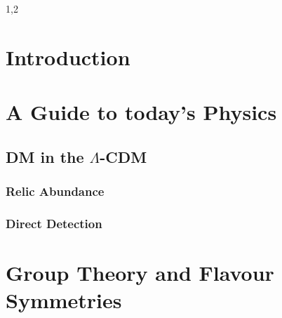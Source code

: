 \documentclass[11pt,a4paper,twoside]{article}
\numberwithin{equation}{section}
\begin{document}
\begin{spacing}{1,2}

\thispagestyle{empty}
 \cleardoublepage

\setcounter{page}{1}
\pagestyle{fancy}

\section{Introduction}


\section{A Guide to today's Physics}
\label{sec_guide}
% 
% 
% 



% 

\subsection{DM in the $\Lambda$-CDM}




\subsubsection{Relic Abundance}
\label{sec_RD}



\subsubsection{Direct Detection}
\label{sec_DMDetection}


\section{Group Theory and Flavour Symmetries}
\label{sec_GT}





\label{sec_modeloutline}


\end{spacing}
\end{document}
